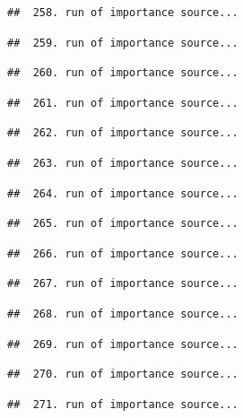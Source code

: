 \documentclass[
]{article}
\begin{document}
\begin{verbatim}
##  258. run of importance source...
\end{verbatim}

\begin{verbatim}
##  259. run of importance source...
\end{verbatim}

\begin{verbatim}
##  260. run of importance source...
\end{verbatim}

\begin{verbatim}
##  261. run of importance source...
\end{verbatim}

\begin{verbatim}
##  262. run of importance source...
\end{verbatim}

\begin{verbatim}
##  263. run of importance source...
\end{verbatim}

\begin{verbatim}
##  264. run of importance source...
\end{verbatim}

\begin{verbatim}
##  265. run of importance source...
\end{verbatim}

\begin{verbatim}
##  266. run of importance source...
\end{verbatim}

\begin{verbatim}
##  267. run of importance source...
\end{verbatim}

\begin{verbatim}
##  268. run of importance source...
\end{verbatim}

\begin{verbatim}
##  269. run of importance source...
\end{verbatim}

\begin{verbatim}
##  270. run of importance source...
\end{verbatim}

\begin{verbatim}
##  271. run of importance source...
\end{verbatim}
\end{document}
